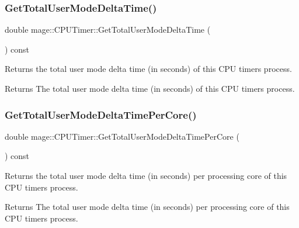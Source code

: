 \subsubsection{\texorpdfstring{Get\+Total\+User\+Mode\+Delta\+Time()}{GetTotalUserModeDeltaTime()}}
{\footnotesize\ttfamily double mage\+::\+C\+P\+U\+Timer\+::\+Get\+Total\+User\+Mode\+Delta\+Time (\begin{DoxyParamCaption}{ }\end{DoxyParamCaption}) const\hspace{0.3cm}{\ttfamily [noexcept]}}

Returns the total user mode delta time (in seconds) of this C\+PU timer\textquotesingle{}s process.

\begin{DoxyReturn}{Returns}
The total user mode delta time (in seconds) of this C\+PU timer\textquotesingle{}s process. 
\end{DoxyReturn}
\hypertarget{classmage_1_1_c_p_u_timer_a8bacfdc05ffbdbb1b8277c31db0b5e59}{}\label{classmage_1_1_c_p_u_timer_a8bacfdc05ffbdbb1b8277c31db0b5e59} 
\subsubsection{\texorpdfstring{Get\+Total\+User\+Mode\+Delta\+Time\+Per\+Core()}{GetTotalUserModeDeltaTimePerCore()}}
{\footnotesize\ttfamily double mage\+::\+C\+P\+U\+Timer\+::\+Get\+Total\+User\+Mode\+Delta\+Time\+Per\+Core (\begin{DoxyParamCaption}{ }\end{DoxyParamCaption}) const\hspace{0.3cm}{\ttfamily [noexcept]}}

Returns the total user mode delta time (in seconds) per processing core of this C\+PU timer\textquotesingle{}s process.

\begin{DoxyReturn}{Returns}
The total user mode delta time (in seconds) per processing core of this C\+PU timer\textquotesingle{}s process. 
\end{DoxyReturn}
\hypertarget{classmage_1_1_c_p_u_timer_a3f48c03a091bacb29fd635a6b27f5dec}{}\label{classmage_1_1_c_p_u_timer_a3f48c03a091bacb29fd635a6b27f5dec} 
